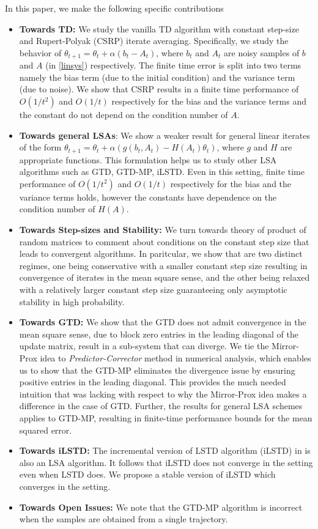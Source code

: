 In this paper, we make the following specific contributions
\begin{itemize}[leftmargin=*]
\item \textbf{Towards TD:} We study the vanilla TD algorithm with constant step-size and Rupert-Polyak (CSRP) iterate averaging. Specifically, we study the behavior of $\theta_{t+1}=\theta_t+\alpha (b_t-A_t)$, where $b_t$ and $A_t$ are noisy samples of $b$ and $A$ (in \eqref{linsys}) respectively. The finite time error is split into two terms namely the bias term (due to the initial condition) and the variance term (due to noise). We show that CSRP results in a finite time performance of $O(1/t^2)$ and $O(1/t)$ respectively for the bias and the variance terms and the constant do not depend on the condition number of $A$.
\item \textbf{Towards general LSAs}: We show a weaker result for general linear iterates of the form $\theta_{t+1}=\theta_t+\alpha (g(b_t,A_t)-H(A_t)\theta_t)$, where $g$ and $H$ are appropriate functions. This formulation helps us to study other LSA algorithms such as GTD, GTD-MP, iLSTD. Even in this setting, finite time performance of $O(1/t^2)$ and $O(1/t)$ respectively for the bias and the variance terms holds, however the constants have dependence on the condition number of $H(A)$.
\item \textbf{Towards Step-sizes and Stability:} We turn towards theory of product of random matrices to comment about conditions on the constant step size that leads to convergent algorithms. In paritcular, we show that are two distinct regimes, one being conservative with a smaller constant step size resulting in convergence of iterates in the mean square sense, and the other being relaxed with a relatively larger constant step size guaranteeing only asymptotic stability in high probability.
\item \textbf{Towards GTD:} We show that the GTD does not admit convergence in the mean square sense, due to block zero entries in the leading diagonal of the update matrix, result in a sub-system that can diverge. We tie the Mirror-Prox idea to \emph{Predictor-Corrector} method in numerical analysis, which enables us to show that the GTD-MP eliminates the divergence issue by ensuring positive entries in the leading diagonal. This provides the much needed intuition that was lacking with respect to why the Mirror-Prox idea makes a difference in the case of GTD. Further, the results for general LSA schemes applies to GTD-MP, resulting in finite-time performance bounds for the mean squared error.
\item \textbf{Towards iLSTD:} The incremental version of LSTD algorithm (iLSTD) in \cite{} is also an LSA algorithm. It follows that iLSTD does not converge in the \ofp setting even when LSTD does. We propose a stable version of iLSTD which converges in the \ofp setting.
\item \textbf{Towards Open Issues:} We note that the GTD-MP algorithm is incorrect when the samples are obtained from a single trajectory.
\end{itemize}
